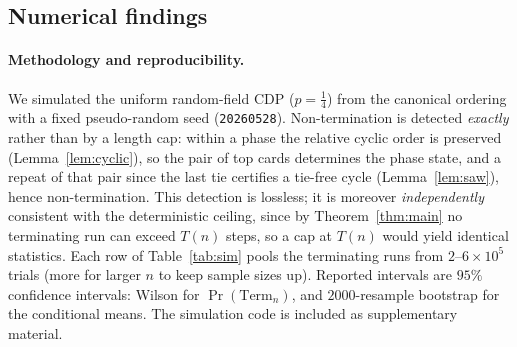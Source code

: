 \documentclass[11pt]{article}
\theoremstyle{definition}
\theoremstyle{remark}
\newcommand{\Term}{\mathrm{Term}}
\begin{document}
\subsection{Numerical findings}\label{sec:numerics}

\paragraph{Methodology and reproducibility.}
We simulated the uniform random-field CDP ($p = \tfrac14$) from the canonical ordering with a fixed pseudo-random seed
(\texttt{20260528}). Non-termination is detected \emph{exactly} rather than by a length cap: within a phase the relative
cyclic order is preserved (Lemma~\ref{lem:cyclic}), so the pair of top cards determines the phase state, and a repeat of
that pair since the last tie certifies a tie-free cycle (Lemma~\ref{lem:saw}), hence non-termination. This detection is
lossless; it is moreover \emph{independently} consistent with the deterministic ceiling, since by
Theorem~\ref{thm:main} no terminating run can exceed $T(n)$ steps, so a cap at $T(n)$ would yield identical statistics.
Each row of Table~\ref{tab:sim} pools the terminating runs from $2$--$6 \times 10^5$ trials (more for larger $n$ to keep
sample sizes up). Reported intervals are $95\%$ confidence intervals: Wilson for $\Pr(\Term_n)$, and $2000$-resample
bootstrap for the conditional means. The simulation code is included as supplementary material.
\end{document}
